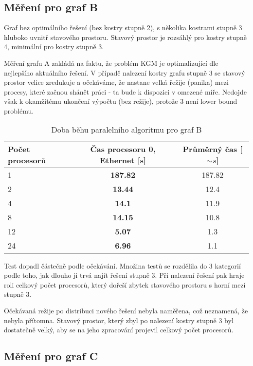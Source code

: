 \documentclass[]{article}
\begin{document}
\subsection{Měření pro graf B}

Graf bez optimálního řešení (bez kostry stupně 2), s několika kostrami stupně 3 hluboko uvnitř stavového prostoru. Stavový prostor je rozsáhlý pro kostry stupně 4, minimální pro kostry stupně 3.

Měření grafu A zakládá na faktu, že problém KGM je optimalizující dle nejlepšího aktuálního řešení. V případě nalezení kostry grafu stupně 3 se stavový prostor velice zredukuje a očekáváme, že nastane velká řežije (panika) mezi procesy, které začnou shánět práci - ta bude k dispozici v omezené míře. Nedojde však k okamžitému ukončení výpočtu (bez režije), protože 3 není lower bound problému.

\begin{table}[h]
\centering
\begin{tabular}{|l|c|c|}
\hline \textbf{Počet procesorů} & \textbf{Čas procesoru 0, Ethernet [s]} & \textbf{Průměrný čas [\(\sim s\)]}\\
\hline 
\hline 1 & \textbf{187.82} & 187.82 \\
\hline 2 &  \textbf{13.44} & 12.4 \\ 
\hline 4 &  \textbf{14.1}  & 11.9 \\ 
\hline 8 &  \textbf{14.15} & 10.8 \\ 
\hline 12 &  \textbf{5.07} & 1.3 \\ 
\hline 24 &  \textbf{6.96} & 1.1 \\
\hline 
\end{tabular}
\caption{Doba běhu paralelního algoritmu pro graf B}
\label{partestB}	
\end{table}

Test dopadl částečně podle očekávání. Množina testů se rozdělila do 3 kategorií podle toho, jak dlouho ji trvá najít řešení stupně 3. Při nalezení řešení pak hraje roli celkový počet procesorů, který dořeší zbytek stavového prostoru s horní mezí stupně 3.

Očekávaná režije po distribuci nového řešení nebyla naměřena, což neznamená, že nebyla přítomna. Stavový prostor, který zbyl po nalezení kostry stupně 3 byl dostatečně velký, aby se na jeho zpracování projevil celkový počet procesorů.


\subsection{Měření pro graf C}
\end{document}
